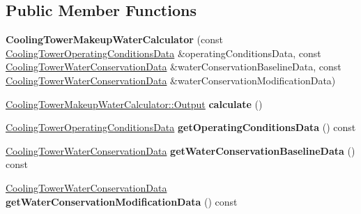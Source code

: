 \subsection*{Public Member Functions}
\begin{DoxyCompactItemize}
\item 
\mbox{\label{class_cooling_tower_makeup_water_calculator_a5b2e764931ef302ba3bd8bbde7775187}} 
{\bfseries Cooling\+Tower\+Makeup\+Water\+Calculator} (const \hyperlink{class_cooling_tower_operating_conditions_data}{Cooling\+Tower\+Operating\+Conditions\+Data} \&operating\+Conditions\+Data, const \hyperlink{class_cooling_tower_water_conservation_data}{Cooling\+Tower\+Water\+Conservation\+Data} \&water\+Conservation\+Baseline\+Data, const \hyperlink{class_cooling_tower_water_conservation_data}{Cooling\+Tower\+Water\+Conservation\+Data} \&water\+Conservation\+Modification\+Data)
\item 
\mbox{\label{class_cooling_tower_makeup_water_calculator_a13eda6b87d0ddbd49289b887c123e5b2}} 
\hyperlink{struct_cooling_tower_makeup_water_calculator_1_1_output}{Cooling\+Tower\+Makeup\+Water\+Calculator\+::\+Output} {\bfseries calculate} ()
\item 
\mbox{\label{class_cooling_tower_makeup_water_calculator_a6c64b1067a7ea2415f15313bcbc8188b}} 
\hyperlink{class_cooling_tower_operating_conditions_data}{Cooling\+Tower\+Operating\+Conditions\+Data} {\bfseries get\+Operating\+Conditions\+Data} () const
\item 
\mbox{\label{class_cooling_tower_makeup_water_calculator_ac130abbb8ec8f5b17a2b3696482b1a66}} 
\hyperlink{class_cooling_tower_water_conservation_data}{Cooling\+Tower\+Water\+Conservation\+Data} {\bfseries get\+Water\+Conservation\+Baseline\+Data} () const
\item 
\mbox{\label{class_cooling_tower_makeup_water_calculator_a4803b3f8e0ea3aa6ef31f686a48b35e7}} 
\hyperlink{class_cooling_tower_water_conservation_data}{Cooling\+Tower\+Water\+Conservation\+Data} {\bfseries get\+Water\+Conservation\+Modification\+Data} () const
\item 
\mbox{\label{class_cooling_tower_makeup_water_calculator_ab854c22dff3139c644399cfb34aba693}} 

\end{DoxyCompactItemize}
